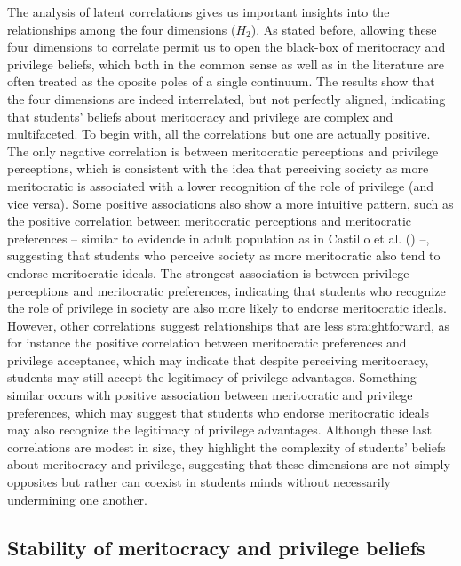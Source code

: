 \documentclass[
  13pt,
]{article}
\begin{document}
The analysis of latent correlations gives us important insights into the
relationships among the four dimensions (\(H_2\)). As stated before,
allowing these four dimensions to correlate permit us to open the
black-box of meritocracy and privilege beliefs, which both in the common
sense as well as in the literature are often treated as the oposite
poles of a single continuum. The results show that the four dimensions
are indeed interrelated, but not perfectly aligned, indicating that
students' beliefs about meritocracy and privilege are complex and
multifaceted. To begin with, all the correlations but one are actually
positive. The only negative correlation is between meritocratic
perceptions and privilege perceptions, which is consistent with the idea
that perceiving society as more meritocratic is associated with a lower
recognition of the role of privilege (and vice versa). Some positive
associations also show a more intuitive pattern, such as the positive
correlation between meritocratic perceptions and meritocratic
preferences -- similar to evidende in adult population as in Castillo et
al. () --, suggesting
that students who perceive society as more meritocratic also tend to
endorse meritocratic ideals. The strongest association is between
privilege perceptions and meritocratic preferences, indicating that
students who recognize the role of privilege in society are also more
likely to endorse meritocratic ideals. However, other correlations
suggest relationships that are less straightforward, as for instance the
positive correlation between meritocratic preferences and privilege
acceptance, which may indicate that despite perceiving meritocracy,
students may still accept the legitimacy of privilege advantages.
Something similar occurs with positive association between meritocratic
and privilege preferences, which may suggest that students who endorse
meritocratic ideals may also recognize the legitimacy of privilege
advantages. Although these last correlations are modest in size, they
highlight the complexity of students' beliefs about meritocracy and
privilege, suggesting that these dimensions are not simply opposites but
rather can coexist in students minds without necessarily undermining one
another.

\subsection{Stability of meritocracy and privilege
beliefs}\label{stability-of-meritocracy-and-privilege-beliefs}
\end{document}
